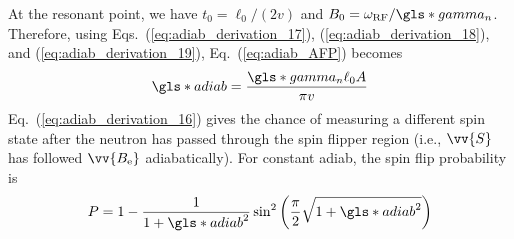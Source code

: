 %
At the resonant point, we have $t_0=\ell_0/(2v)$ and $B_0=\omega_\text{RF}/\gls*{gamma_n}$. Therefore, using Eqs.~(\ref{eq:adiab_derivation_17}), (\ref{eq:adiab_derivation_18}), and (\ref{eq:adiab_derivation_19}), Eq.~(\ref{eq:adiab_AFP}) becomes
%
\begin{gather}
    \gls*{adiab} = \frac{\gls*{gamma_n} \ell_0 A}{\pi v}
\end{gather}
%
Eq.~(\ref{eq:adiab_derivation_16}) gives the chance of measuring a different spin state after the neutron has passed through the spin flipper region (i.e., $\vv{S}$ has followed $\vv{B_\text{e}}$ adiabatically). For constant \gls*{adiab}, the spin flip probability is
%
\begin{gather}
    P=1-\frac{1}{1+\gls*{adiab}^{2}}\sin^{2}\left(\frac{\pi}{2}\sqrt{1+\gls*{adiab}^{2}}\right)
\end{gather}

